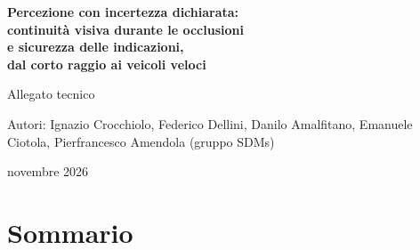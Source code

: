 
\newcommand{\autori}{Ignazio Crocchiolo, Federico Dellini, Danilo Amalfitano, Emanuele Ciotola, Pierfrancesco Amendola (gruppo SDMs)}

\begin{titlepage}
\centering
\vspace*{4cm}
{\LARGE\bfseries\color{accent} Percezione con incertezza dichiarata:\\[4pt] continuità visiva durante le occlusioni\\[4pt] e sicurezza delle indicazioni,\\[4pt] dal corto raggio ai veicoli veloci\par}
\vspace{1.2cm}
{\Large Allegato tecnico\par}
\vspace{2.5cm}
{\large Autori: \autori\par}
\vspace{0.8cm}
{\large novembre 2026\par}
\vfill
\end{titlepage}

\section*{Sommario}


\tableofcontents
\clearpage

\clearpage












\clearpage
\appendix


\clearpage
\begingroup\sloppy\def\UrlBreaks{\do\/\do\-\do\_\do\.}


\endgroup

